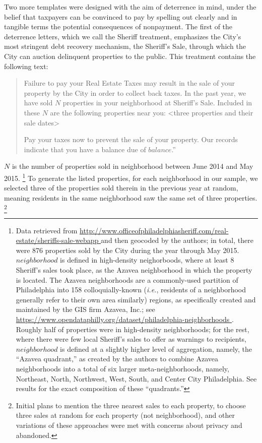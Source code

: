 \documentclass[12pt,titlepage]{article}
\begin{document}
Two more templates were designed with the aim of deterrence in mind, under 
the belief that taxpayers can be convinced to pay by spelling out clearly 
and in tangible terms the potential consequences of nonpayment. The first 
of the deterrence letters, which we call the Sheriff treatment, emphasizes 
the City's most stringent debt recovery mechanism, the Sheriff's Sale, 
through which the City can auction delinquent properties to the public. 
This treatment contains the following text: 

\blockquote{
	Failure to pay your Real Estate Taxes may result in the sale of 
	your property by the City in order to collect back taxes. In the 
	past year, we have sold $N$ properties in your neighborhood at 
	Sheriff's Sale.	Included in these $N$ are the following properties 
	near you: <three properties and their sale dates> 

	Pay your taxes now to prevent the sale of your property. 
	Our records indicate that you have a balance due of $balance$.”
}

$N$ is the number of properties sold in neighborhood between June 2014
and May 2015.
\footnote{\label{fn:neighborhoods}
	Data retrieved from
	\url{
	http://www.officeofphiladelphiasheriff.com/real-estate/sheriffs-sale-webapp
	}
	and then geocoded by the authors; in total, there were 876 properties 
	sold by the City during the year through May 2015. $neighborhood$ is defined 
	in high-density neighorboods, where at least 8 Sheriff's sales took place,
	as the Azavea neighborhood in which the property is located. The Azavea 
	neighborhoods are a commonly-used partition of Philadelphia into 158 
	colloquially-known (\textit{i.e.}, residents of a neighborhood generally refer to 
	their own area similarly) regions, as specifically created and maintained 
	by the GIS firm Azavea, Inc.; see 
	\url{
	https://www.opendataphilly.org/dataset/philadelphia-neighborhoods
	}
	. Roughly half of properties were in high-density neighborhoods; for the rest, where 
	there were few local Sheriff's sales to offer as warnings to recipients, 
	$neighborhood$ is defined at a slightly higher level of aggregation, namely, 
	the “Azavea quadrant,” as created by the authors to combine Azavea 
	neighborhoods into a total of six larger meta-neighborhoods, namely, 
	Northeast, North, Northwest, West, South, and Center City Philadelphia. 
	See results for the exact composition of these “quadrants.”
}
To generate the listed properties, for each neighborhood
in our sample, we selected three of the properties sold therein in the
previous year at random, meaning residents in the same neighborhood
saw the same set of three properties.
\footnote{
	Initial plans to mention the three nearest sales to each property, 
	to choose three sales at random for each property (not neighborhood), 
	and other variations of these approaches were met with concerns 
	about privacy and abandoned.
}
\end{document}
